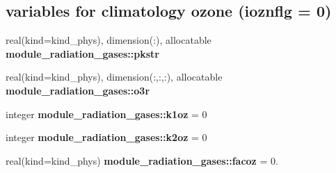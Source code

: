 \subsection*{variables for climatology ozone (ioznflg = 0)}
\begin{DoxyCompactItemize}
\item 
\mbox{\label{group__module__radiation__gases_gac7466def3963591ebfc48298806b1f6a}} 
real(kind=kind\+\_\+phys), dimension(\+:), allocatable {\bfseries module\+\_\+radiation\+\_\+gases\+::pkstr}
\item 
\mbox{\label{group__module__radiation__gases_gad18392d991a9ef4b6ff0e8e822176a18}} 
real(kind=kind\+\_\+phys), dimension(\+:,\+:,\+:), allocatable {\bfseries module\+\_\+radiation\+\_\+gases\+::o3r}
\item 
\mbox{\label{group__module__radiation__gases_ga0a14666484f230d3506a9b4740e2eeda}} 
integer {\bfseries module\+\_\+radiation\+\_\+gases\+::k1oz} = 0
\item 
\mbox{\label{group__module__radiation__gases_ga0c3727c9e2a0bec46e84622c4591cd8b}} 
integer {\bfseries module\+\_\+radiation\+\_\+gases\+::k2oz} = 0
\item 
\mbox{\label{group__module__radiation__gases_gac7c9fd8ece69872fdef473020ea03d6b}} 
real(kind=kind\+\_\+phys) {\bfseries module\+\_\+radiation\+\_\+gases\+::facoz} = 0.
\end{DoxyCompactItemize}
